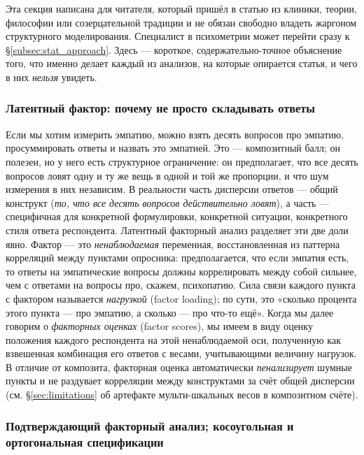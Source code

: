 Эта секция написана для читателя, который пришёл в статью из клиники, теории, философии или созерцательной традиции и не обязан свободно владеть жаргоном структурного моделирования. Специалист в психометрии может перейти сразу к §\ref{subsec:stat_approach}. Здесь --- короткое, содержательно-точное объяснение того, что именно делает каждый из анализов, на которые опирается статья, и чего в них \emph{нельзя} увидеть.

\subsubsection{Латентный фактор: почему не просто складывать ответы}

Если мы хотим измерить эмпатию, можно взять десять вопросов про эмпатию, просуммировать ответы и назвать это эмпатией. Это --- композитный балл; он полезен, но у него есть структурное ограничение: он предполагает, что все десять вопросов ловят одну и ту же вещь в одной и той же пропорции, и что шум измерения в них независим. В реальности часть дисперсии ответов --- общий конструкт (\emph{то, что все десять вопросов действительно ловят}), а часть --- специфичная для конкретной формулировки, конкретной ситуации, конкретного стиля ответа респондента. Латентный факторный анализ разделяет эти две доли явно. Фактор --- это \emph{ненаблюдаемая} переменная, восстановленная из паттерна корреляций между пунктами опросника: предполагается, что если эмпатия есть, то ответы на эмпатические вопросы должны коррелировать между собой сильнее, чем с ответами на вопросы про, скажем, психопатию. Сила связи каждого пункта с фактором называется \emph{нагрузкой} (factor loading); по сути, это «сколько процента этого пункта --- про эмпатию, а сколько --- про что-то ещё». Когда мы далее говорим о \emph{факторных оценках} (factor scores), мы имеем в виду оценку положения каждого респондента на этой ненаблюдаемой оси, полученную как взвешенная комбинация его ответов с весами, учитывающими величину нагрузок. В отличие от композита, факторная оценка автоматически \emph{пенализирует} шумные пункты и не раздувает корреляции между конструктами за счёт общей дисперсии (см. §\ref{sec:limitations} об артефакте мульти-шкальных весов в композитном счёте).

\subsubsection{Подтверждающий факторный анализ; косоугольная и ортогональная спецификации}

